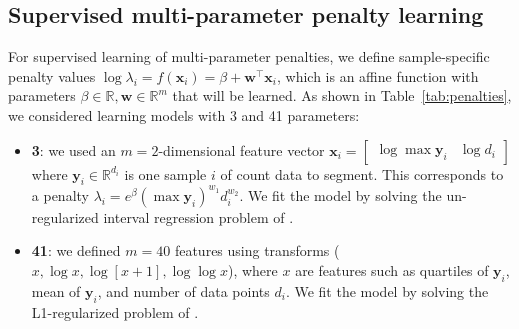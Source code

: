 \documentclass{article}
\newcommand{\RR}{\mathbb R}
\begin{document}
\subsection{Supervised multi-parameter penalty learning}
\label{sec:supervised-multi}

For supervised learning of multi-parameter penalties, we
define sample-specific penalty values $\log \lambda_i = f(\mathbf
x_i)= \beta + \mathbf w^\intercal \mathbf x_i$, which is an affine
function with parameters $\beta\in\RR,\mathbf w\in\RR^m$ that will be
learned. As shown in Table~\ref{tab:penalties}, we considered learning
models with 3 and 41 parameters:

\begin{itemize}
\item \textbf{3}: we used an $m=2$-dimensional feature
  vector $\mathbf x_i = \left[\begin{array}{cc} \log\max \mathbf y_i &
      \log d_i
\end{array}\right]$ where $\mathbf y_i\in\RR^{d_i}$ 
is one sample $i$ of count data to segment.
This corresponds to a penalty $\lambda_i = e^\beta (\max\mathbf
y_i)^{w_1} d_i^{w_2}$. We fit the model by solving the un-regularized
interval regression problem of \citet{HOCKING-penalties}.
\item \textbf{41}: we defined $m=40$ features using transforms ($x,
  \log x, \log[x+1], \log\log x$), where $x$ are features such as
  quartiles of $\mathbf y_i$, mean of $\mathbf y_i$, and
  number of data points $d_i$. We fit the model by solving
  the L1-regularized problem of
  \citet{HOCKING-penalties}.
\end{itemize}
\end{document}
